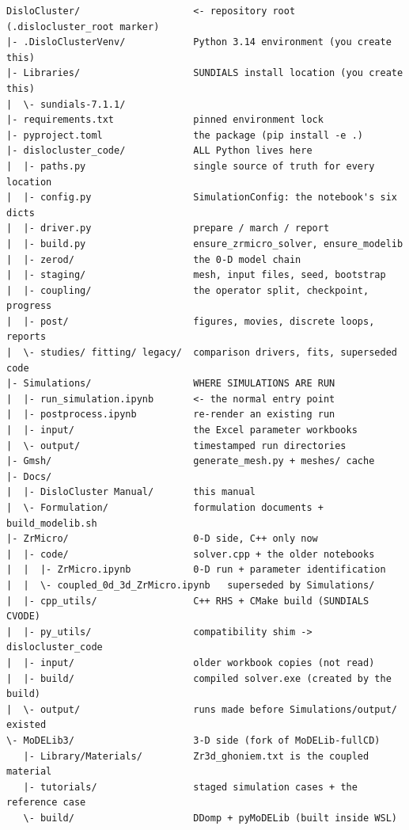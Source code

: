 \documentclass[11pt]{article}
\begin{document}
\begin{lstlisting}
DisloCluster/                    <- repository root (.dislocluster_root marker)
|- .DisloClusterVenv/            Python 3.14 environment (you create this)
|- Libraries/                    SUNDIALS install location (you create this)
|  \- sundials-7.1.1/
|- requirements.txt              pinned environment lock
|- pyproject.toml                the package (pip install -e .)
|- dislocluster_code/            ALL Python lives here
|  |- paths.py                   single source of truth for every location
|  |- config.py                  SimulationConfig: the notebook's six dicts
|  |- driver.py                  prepare / march / report
|  |- build.py                   ensure_zrmicro_solver, ensure_modelib
|  |- zerod/                     the 0-D model chain
|  |- staging/                   mesh, input files, seed, bootstrap
|  |- coupling/                  the operator split, checkpoint, progress
|  |- post/                      figures, movies, discrete loops, reports
|  \- studies/ fitting/ legacy/  comparison drivers, fits, superseded code
|- Simulations/                  WHERE SIMULATIONS ARE RUN
|  |- run_simulation.ipynb       <- the normal entry point
|  |- postprocess.ipynb          re-render an existing run
|  |- input/                     the Excel parameter workbooks
|  \- output/                    timestamped run directories
|- Gmsh/                         generate_mesh.py + meshes/ cache
|- Docs/
|  |- DisloCluster Manual/       this manual
|  \- Formulation/               formulation documents + build_modelib.sh
|- ZrMicro/                      0-D side, C++ only now
|  |- code/                      solver.cpp + the older notebooks
|  |  |- ZrMicro.ipynb           0-D run + parameter identification
|  |  \- coupled_0d_3d_ZrMicro.ipynb   superseded by Simulations/
|  |- cpp_utils/                 C++ RHS + CMake build (SUNDIALS CVODE)
|  |- py_utils/                  compatibility shim -> dislocluster_code
|  |- input/                     older workbook copies (not read)
|  |- build/                     compiled solver.exe (created by the build)
|  \- output/                    runs made before Simulations/output/ existed
\- MoDELib3/                     3-D side (fork of MoDELib-fullCD)
   |- Library/Materials/         Zr3d_ghoniem.txt is the coupled material
   |- tutorials/                 staged simulation cases + the reference case
   \- build/                     DDomp + pyMoDELib (built inside WSL)
\end{lstlisting}
\end{document}
